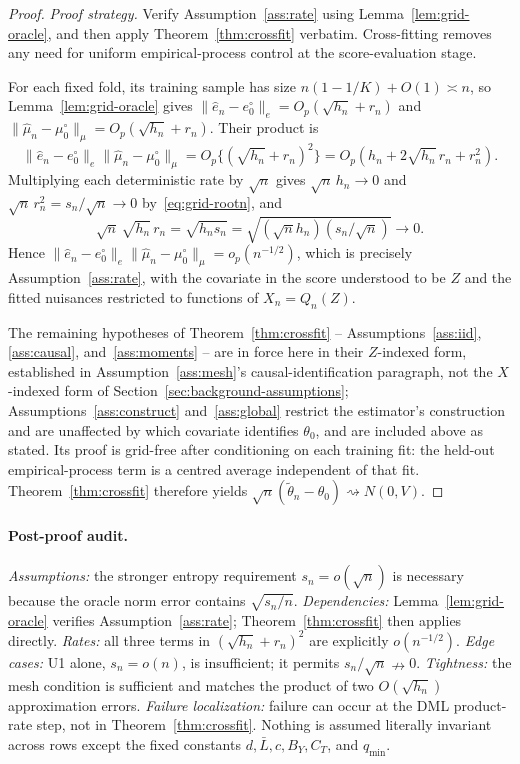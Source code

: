 \documentclass[11pt]{article}
\theoremstyle{plain}
\theoremstyle{definition}
\theoremstyle{remark}
\newcommand{\ez}{e_0}
\newcommand{\mz}{\mu_0}
\newcommand{\thetatil}{\widetilde{\theta}}
\begin{document}
\begin{proof}
\emph{Proof strategy.} Verify Assumption~\ref{ass:rate} using
Lemma~\ref{lem:grid-oracle}, and then apply Theorem~\ref{thm:crossfit}
verbatim. Cross-fitting removes any need for uniform empirical-process
control at the score-evaluation stage.

For each fixed fold, its training sample has size $n(1-1/K)+O(1)\asymp n$,
so Lemma~\ref{lem:grid-oracle} gives
$\|\widehat e_n-\ez^\circ\|_e=O_p(\sqrt{h_n}+r_n)$ and
$\|\widehat\mu_n-\mz^\circ\|_\mu=O_p(\sqrt{h_n}+r_n)$. Their product is
\[
 \|\widehat e_n-\ez^\circ\|_e\|\widehat\mu_n-\mz^\circ\|_\mu
 =O_p\{(\sqrt{h_n}+r_n)^2\}
 =O_p\left(h_n+2\sqrt{h_n}\,r_n+r_n^2\right).
\]
Multiplying each deterministic rate by $\sqrt n$ gives $\sqrt n\,h_n\to0$
and $\sqrt n\,r_n^2=s_n/\sqrt n\to0$ by~\eqref{eq:grid-rootn}, and
\[
 \sqrt n\,\sqrt{h_n}\,r_n
 =\sqrt{h_ns_n}
 =\sqrt{(\sqrt n h_n)(s_n/\sqrt n)}
 \longrightarrow0.
\]
Hence $\|\widehat e_n-\ez^\circ\|_e\|\widehat\mu_n-\mz^\circ\|_\mu
=o_p(n^{-1/2})$, which is precisely Assumption~\ref{ass:rate}, with the
covariate in the score understood to be $Z$ and the fitted nuisances
restricted to functions of $X_n=Q_n(Z)$.

The remaining hypotheses of Theorem~\ref{thm:crossfit} --
Assumptions~\ref{ass:iid}, \ref{ass:causal}, and~\ref{ass:moments} --
are in force here in their $Z$-indexed form, established in
Assumption~\ref{ass:mesh}'s causal-identification paragraph, not the
$X$-indexed form of Section~\ref{sec:background-assumptions};
Assumptions~\ref{ass:construct} and~\ref{ass:global} restrict the
estimator's construction and are unaffected by which covariate identifies
$\theta_0$, and are included above as stated. Its proof is grid-free after
conditioning on each training fit: the held-out empirical-process term is a
centred average independent of that fit. Theorem~\ref{thm:crossfit}
therefore yields $\sqrt n(\thetatil_n-\theta_0)\rightsquigarrow N(0,V)$.
\end{proof}

\paragraph{Post-proof audit.}
\emph{Assumptions:} the stronger entropy requirement $s_n=o(\sqrt n)$ is
necessary because the oracle norm error contains $\sqrt{s_n/n}$.
\emph{Dependencies:} Lemma~\ref{lem:grid-oracle} verifies
Assumption~\ref{ass:rate}; Theorem~\ref{thm:crossfit} then applies
directly.
\emph{Rates:} all three terms in $(\sqrt{h_n}+r_n)^2$ are explicitly
$o(n^{-1/2})$.
\emph{Edge cases:} U1 alone, $s_n=o(n)$, is insufficient; it permits
$s_n/\sqrt n\nrightarrow0$.
\emph{Tightness:} the mesh condition is sufficient and matches the product
of two $O(\sqrt{h_n})$ approximation errors.
\emph{Failure localization:} failure can occur at the DML product-rate
step, not in Theorem~\ref{thm:crossfit}. Nothing is assumed literally
invariant across rows except the fixed constants $d,\bar L,c,B_Y,C_T$, and
$q_{\min}$.
\end{document}

